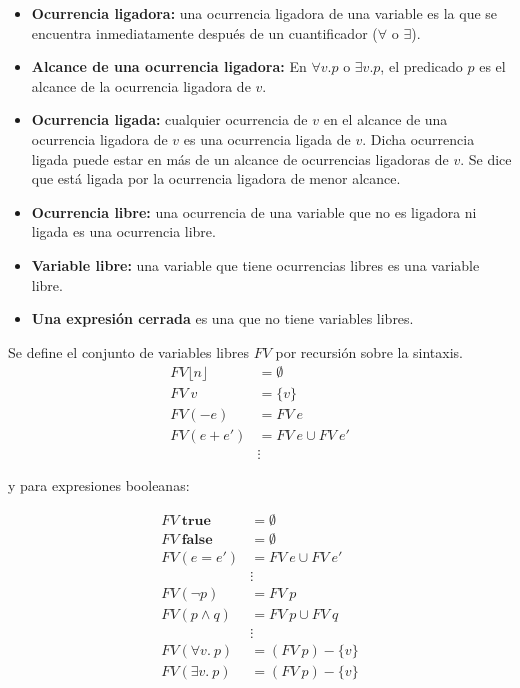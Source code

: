 \documentclass[a4paper,12pt]{article}
\begin{document}
\begin{itemize}
    \item \textbf{Ocurrencia ligadora:} una ocurrencia ligadora de una variable es la que se encuentra inmediatamente después de un cuantificador ($\forall$ o $\exists$).
    
    \item \textbf{Alcance de una ocurrencia ligadora:} En $\forall v. p$ o $\exists v. p$, el predicado $p$ es el alcance de la ocurrencia ligadora de $v$.
    
    \item \textbf{Ocurrencia ligada:} cualquier ocurrencia de $v$ en el alcance de una ocurrencia ligadora de $v$ es una ocurrencia ligada de $v$. Dicha ocurrencia ligada puede estar en más de un alcance de ocurrencias ligadoras de $v$. Se dice que está ligada por la ocurrencia ligadora de menor alcance.
    
    \item \textbf{Ocurrencia libre:} una ocurrencia de una variable que no es ligadora ni ligada es una ocurrencia libre.
    
    \item \textbf{Variable libre:} una variable que tiene ocurrencias libres es una variable libre.
    
    \item \textbf{Una expresión cerrada} es una que no tiene variables libres.
\end{itemize}

Se define el conjunto de variables libres $FV$ por recursión sobre la sintaxis.
\begin{align*}
    FV \lfloor n \rfloor &= \emptyset \\
    FV \ v &= \{v\} \\
    FV (-e) &= FV \ e \\
    FV (e + e') &= FV \ e \cup FV \ e' \\
    &\vdots
\end{align*}

y para expresiones booleanas:

\begin{align*}
    FV \ \textbf{true} &= \emptyset \\
    FV \ \textbf{false} &= \emptyset \\
    FV (e = e') &= FV \ e \cup FV \ e' \\
    &\vdots \\
    FV (\neg p) &= FV \ p \\
    FV (p \wedge q) &= FV \ p \cup FV \ q \\
    &\vdots \\
    FV (\forall v. \ p) &= (FV \ p) - \{v\} \\
    FV (\exists v. \ p) &= (FV \ p) - \{v\}
\end{align*}
\end{document}
